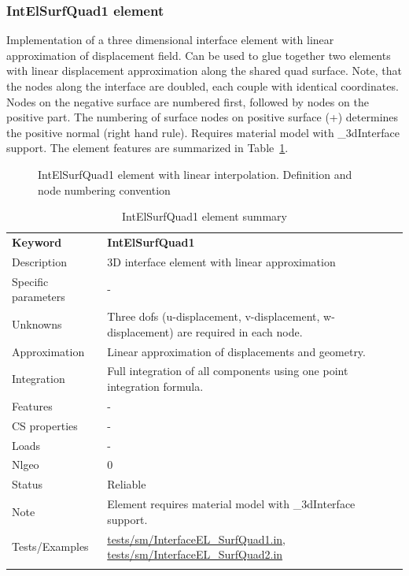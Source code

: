 \documentclass[a4paper]{article}
\newcommand{\param}[1]{\texttt{#1}} %
\newcommand{\templabel}{}%
\newcommand{\tempcaption}{}%
\newcounter{nelpar}
\newenvironment{elementsummary}[5]{%
  \gdef\tempcaption{#4}%
  \gdef\templabel{#5}%
  \setcounter{nelpar}{0}%
  \begin{center} %
    \begin{table}[!htb] %
      \begin{tabular}{|l|p{9cm}|}\hline %
        {\bf Keyword} & \bf{#1}\\ %
        {Description} & {#2}\\ %
        {Specific parameters} & {#3}\\ \hline %
}{
  \\ \hline %
      \end{tabular}%
      \caption{\tempcaption}%
      \label{\templabel}%
    \end{table}%
  \end{center}%
}
\newcommand{\elementParam}[1]{%
  \ifthenelse{\value{nelpar}>0} %
             {&{#1}}%
             {\setcounter{nelpar}{1}Parameters&{#1}}%
             \\%
}
\newcommand{\elementDescription}[2]{{#1} & {#2}\\}
\begin{document}
\subsubsection{IntElSurfQuad1 element}
Implementation of a three dimensional interface element with linear
approximation of displacement field. Can be used to glue together two elements with linear displacement approximation along the shared quad surface. Note, that the nodes along the interface are doubled, each couple with identical coordinates. Nodes on the negative surface are numbered first, followed by nodes on the positive part. The numbering of surface nodes on positive surface (+) determines the positive normal (right hand rule). Requires material model with \_3dInterface support. The element features are summarized in Table~\ref{Interface3dquadlinsummary}.

\begin{figure}[htb]
 \centering
 \begin{makeimage}
  
 \end{makeimage}
 \caption{IntElSurfQuad1 element with linear interpolation. Definition and node numbering convention}
 \label{interf3dquad_lin_fig}
\end{figure}

\begin{elementsummary}{IntElSurfQuad1}{3D  interface element with linear approximation}{-}{IntElSurfQuad1 element summary}{Interface3dquadlinsummary}
\elementDescription{Unknowns}{Three dofs (u-displacement, v-displacement, w-displacement) are required in each node.}
\elementDescription{Approximation}{Linear approximation of displacements and geometry.}
\elementDescription{Integration}{Full integration of all components using one point integration formula.}
\elementDescription{Features}{-}
\elementDescription{CS properties}{-}
\elementDescription{Loads}{-}
\elementDescription{Nlgeo}{0}
\elementDescription{Status}{Reliable}
\elementDescription{Note}{Element requires material model with \_3dInterface support.}
\elementDescription{Tests/Examples}{\href{https://github.com/oofem/oofem/blob/devel/tests/sm/InterfaceEL\_SurfQuad1.in}{tests/sm/InterfaceEL\_SurfQuad1.in},
  \href{https://github.com/oofem/oofem/blob/devel/tests/sm/InterfaceEL\_SurfQuad2.in}{tests/sm/InterfaceEL\_SurfQuad2.in}
}
\end{elementsummary}
\end{document}
